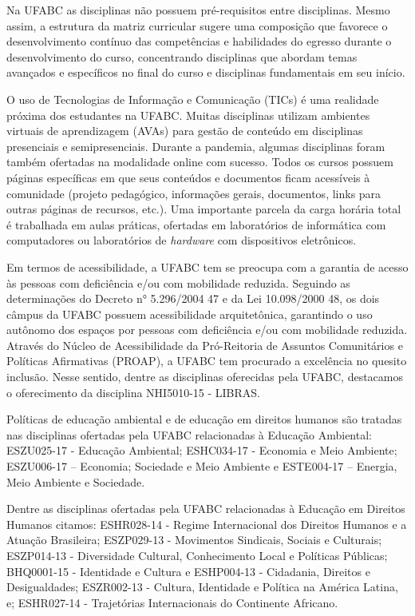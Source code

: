 \documentclass{article}
\begin{document}
Na UFABC as disciplinas não possuem pré-requisitos entre disciplinas. Mesmo assim, a estrutura da matriz curricular sugere uma composição
que favorece o desenvolvimento contínuo das competências e habilidades do egresso durante o desenvolvimento do curso, concentrando 
disciplinas que abordam temas avançados e específicos no final do curso e disciplinas fundamentais em seu início.

O uso de Tecnologias de Informação e Comunicação (TICs) é uma realidade próxima dos estudantes na UFABC. Muitas disciplinas
utilizam ambientes virtuais de aprendizagem (AVAs) para gestão de conteúdo em disciplinas presenciais e semipresenciais. Durante
a pandemia, algumas disciplinas foram também ofertadas na modalidade online com sucesso. Todos os cursos possuem páginas 
específicas em que seus conteúdos e documentos ficam acessíveis à comunidade (projeto pedagógico, informações gerais, documentos, links para outras páginas de recursos, etc.). Uma importante parcela da carga horária total é trabalhada em aulas práticas, ofertadas em laboratórios de informática com computadores ou laboratórios de {\it hardware} com dispositivos eletrônicos.
 

Em termos de acessibilidade, a UFABC tem se preocupa com a garantia de acesso às
pessoas com deficiência e/ou com mobilidade reduzida. Seguindo as determinações do
Decreto n° 5.296/2004 47 e da Lei 10.098/2000 48, os dois câmpus da UFABC possuem
acessibilidade arquitetônica, garantindo o uso autônomo dos espaços por pessoas com
deficiência e/ou com mobilidade reduzida. Através do Núcleo de Acessibilidade da Pró-Reitoria
de Assuntos Comunitários e Políticas Afirmativas (PROAP), a UFABC tem procurado a
excelência no quesito inclusão. Nesse sentido, dentre as disciplinas oferecidas pela UFABC,
destacamos o oferecimento da disciplina NHI5010-15 - LIBRAS.

Políticas de educação ambiental e de educação em direitos humanos são tratadas 
nas disciplinas ofertadas pela UFABC relacionadas à Educação Ambiental: 
ESZU025-17 - Educação Ambiental; ESHC034-17 - Economia e Meio Ambiente; 
ESZU006-17 – Economia; Sociedade e Meio Ambiente e
ESTE004-17 – Energia, Meio Ambiente e Sociedade.

Dentre as disciplinas ofertadas pela UFABC relacionadas à Educação em Direitos
Humanos citamos: ESHR028-14 - Regime Internacional dos Direitos Humanos e a Atuação
Brasileira; ESZP029-13 - Movimentos Sindicais, Sociais e Culturais; ESZP014-13 - Diversidade
Cultural, Conhecimento Local e Políticas Públicas; BHQ0001-15 - Identidade e Cultura e
ESHP004-13 - Cidadania, Direitos e Desigualdades; ESZR002-13 - Cultura, Identidade e
Política na América Latina, e; ESHR027-14 - Trajetórias Internacionais do Continente Africano.
\end{document}

